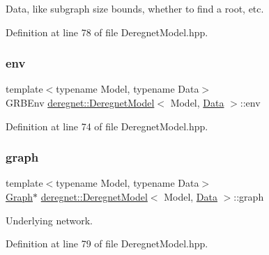 Data, like subgraph size bounds, whether to find a root, etc. 



Definition at line 78 of file Deregnet\+Model.\+hpp.

\mbox{\label{classderegnet_1_1DeregnetModel_accd03120356b80b083041b4eef003e5b}} 
\subsubsection{\texorpdfstring{env}{env}}
{\footnotesize\ttfamily template$<$typename Model, typename Data$>$ \\
G\+R\+B\+Env \hyperlink{classderegnet_1_1DeregnetModel}{deregnet\+::\+Deregnet\+Model}$<$ Model, \hyperlink{avgdrgnt_8cpp_a1d1235306db276e9b36acba1db1509e8}{Data} $>$\+::env\hspace{0.3cm}{\ttfamily [protected]}}



Definition at line 74 of file Deregnet\+Model.\+hpp.

\mbox{\label{classderegnet_1_1DeregnetModel_a3cd2f54b8e061ef5bed32708d9bc1ef1}} 
\subsubsection{\texorpdfstring{graph}{graph}}
{\footnotesize\ttfamily template$<$typename Model, typename Data$>$ \\
\hyperlink{namespacederegnet_a55b76c55bbabc682cbc61f8b9948799e}{Graph}$\ast$ \hyperlink{classderegnet_1_1DeregnetModel}{deregnet\+::\+Deregnet\+Model}$<$ Model, \hyperlink{avgdrgnt_8cpp_a1d1235306db276e9b36acba1db1509e8}{Data} $>$\+::graph\hspace{0.3cm}{\ttfamily [protected]}}



Underlying network. 



Definition at line 79 of file Deregnet\+Model.\+hpp.

\mbox{\label{classderegnet_1_1DeregnetModel_a30d525de2086e342b33fe3e45ede4947}} 
